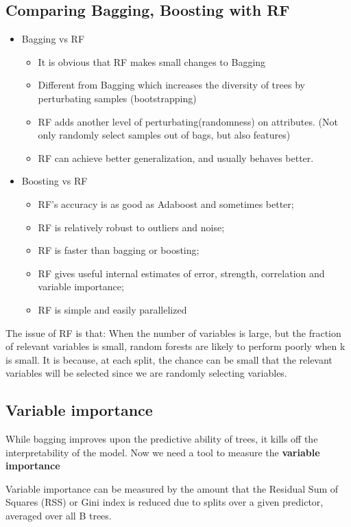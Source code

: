 \documentclass[letterpaper,12pt]{article}
\begin{document}
 \subsection{Comparing Bagging, Boosting with RF}
 \begin{itemize}
    \item Bagging vs RF 
    \begin{itemize}
        \item It is obvious that RF makes small changes to Bagging
        \item Different from Bagging which increases the diversity of trees by perturbating samples (bootstrapping)
        \item RF adds another level of perturbating(randomness) on attributes. (Not only randomly select samples out of bags, but also features)
        \item RF can achieve better generalization, and usually behaves better.
    \end{itemize}
    \item Boosting vs RF
    \begin{itemize}
        \item RF's accuracy is as good as Adaboost and sometimes better;
        \item RF is relatively robust to outliers and noise;
        \item RF is faster than bagging or boosting;
        \item RF gives useful internal estimates of error, strength, correlation and variable importance;
        \item RF is simple and easily parallelized
    \end{itemize}
 \end{itemize}


The issue of RF is that: When the number of variables is large, but the fraction of relevant variables is small, random forests are likely to perform poorly when k is small. It is because, at each split, the chance can be small that the relevant variables will be selected since we are randomly selecting variables.
\subsection{Variable importance}
While bagging improves upon the predictive ability of trees, it kills off the interpretability of the model. Now we need a tool to measure the \textbf{variable importance}

Variable importance can be measured by the amount that the Residual Sum of Squares (RSS) or Gini index is reduced due to splits over a given predictor, averaged over all B trees. 
\end{document}
